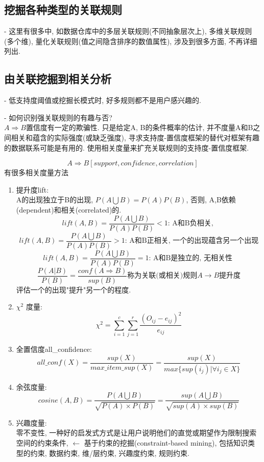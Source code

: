 \documentclass[a4paper,10pt,english]{article}
\begin{document}
\subsection{挖掘各种类型的关联规则}
\begin{description}
\item {-}
\small{
这里有很多中, 如数据仓库中的多层关联规则(不同抽象层次上), 多维关联规则(多个维), 量化关联规则(值之间隐含排序的数值属性), 涉及到很多方面, 不再详细列出.}
\end{description}

\subsection{由关联挖掘到相关分析}
\begin{description}
\item {-}
\small{
低支持度阈值或挖掘长模式时, 好多规则都不是用户感兴趣的. \\
}
\item {-}
\small{
如何识别强关联规则的有趣与否? \\
$A \Rightarrow B$置信度有一定的欺骗性. 只是给定A, B的条件概率的估计, 并不度量A和B之间相关和蕴含的实际强度(或缺乏强度), 寻求支持度-置信度框架的替代对框架有趣的数据联系可能是有用的. 使用相关度量来扩充关联规则的支持度-置信度框架. 
}
\end{description}
$$ A \Rightarrow B [support, confidence, correlation] $$
有很多相关度量方法
\begin{enumerate}
\item {提升度lift:}\\
A的出现独立于B的出现, $P(A \bigcup B)=P(A)P(B)$, 否则, A,B依赖(dependent)和相关(correlated)的.
$$ lift(A, B) = \frac{P(A \bigcup B)}{P(A)P(B)} < 1 \mbox{: A和B负相关, }$$
$$ lift(A, B) = \frac{P(A \bigcup B)}{P(A)P(B)} > 1 \mbox{: A和B正相关, 一个的出现蕴含另一个出现}$$
$$ lift(A, B) = \frac{P(A \bigcup B)}{P(A)P(B)} = 1 \mbox{: A和B是独立的, 无相关性 }$$
$$ \frac{P(A | B)}{P(B)} = \frac{conf(A \Rightarrow B)}{sup(B)} \mbox{称为关联(或相关)规则} A \rightarrow B \mbox{提升度} $$ 评估一个的出现"提升"另一个的程度.

\item {$ \chi^{2}$ 度量:}\\
$$ \chi^{2}= \sum_{i=1}^{c}\sum_{j=1}^{r}\frac{(O_{ij}-e_{ij})^2}{e_{ij}}$$

\item {全置信度all\_confidence:} \\
$$ all\_conf(X)=\frac{sup(X)}{max\_item\_sup(X)}=\frac{sup(X)}{max\{sup(i_j)|\forall i_j \in X \}}$$

\item {余弦度量:}
$$ cosine(A, B)=\frac{P(A \bigcup B)}{\sqrt{P(A) \times P(B)}}=\frac{sup(A \bigcup B)}{\sqrt{sup(A) \times sup(B)}} $$

\item {兴趣度量:} \\
零不变性, 一种好的启发式方式是让用户说明他们的直觉或期望作为限制搜索空间的约束条件, $\longleftarrow$ 基于约束的挖掘(constraint-based mining), 包括知识类型的约束, 数据约束, 维/层约束, 兴趣度约束, 规则约束. 
\end{enumerate}
\end{document}
